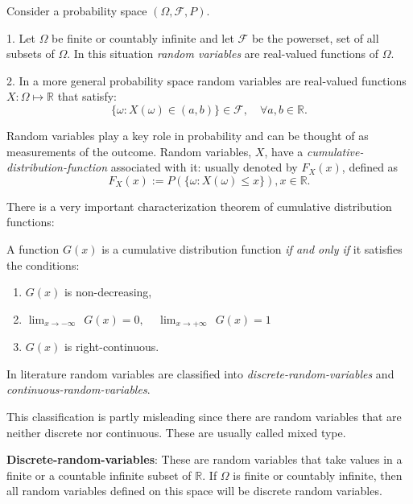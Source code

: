 
Consider a probability space $(\Omega,\mathcal{F},P)$.

1. Let $\Omega$ be finite or countably infinite and let $\mathcal{F}$ be the powerset, set of all subsets of $\Omega$. In this situation \textit{random variables} are real-valued functions of $\Omega$.

2. In a more general probability space random variables are real-valued functions $X:\Omega \mapsto \mathbb{R}$ that satisfy:
$$\{\omega: X(\omega) \in (a,b)\} \in \mathcal{F}, \quad \forall a,b \in \mathbb{R}.$$

Random variables play a key role in probability and can be thought of as measurements of the outcome. Random variables, $X$, have a \textit{cumulative-distribution-function} associated with it: usually denoted by $F_X(x)$, defined as
$$ F_X(x):= P(\{\omega: X(\omega)\leq x\}), x \in \mathbb{R}.$$

There is a very important characterization theorem of cumulative distribution functions:

A function $G(x)$ is a cumulative distribution function \textit{if and only if} it satisfies the conditions:
\begin{enumerate}[$(i)$]
\item $G(x)$ is non-decreasing,
\item $\lim_{x \to -\infty} ~~ G(x) = 0, ~~~~~ \lim_{x \to +\infty} ~~ G(x) = 1$
\item $G(x)$ is right-continuous.
\end{enumerate}




In literature random variables are classified into \textit{discrete-random-variables} and \textit{continuous-random-variables}.

\begin{remark}
This classification is partly misleading since there are random variables that are neither discrete nor continuous. These are usually called mixed type.
\end{remark}

\textbf{Discrete-random-variables}: These are random variables that take values in a finite or a countable infinite subset of $\mathbb{R}$. If $\Omega$ is finite or countably infinite, then all random variables defined on this space will be discrete random variables.

